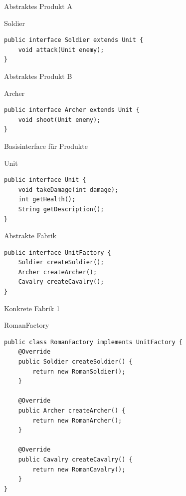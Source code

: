 \begin{frame}[fragile]{Abstraktes Produkt A}
	\begin{exampleblock}{Soldier}
 		\begin{lstlisting}
public interface Soldier extends Unit {
    void attack(Unit enemy);
}
        \end{lstlisting}
 	\end{exampleblock}
\end{frame}

\begin{frame}[fragile]{Abstraktes Produkt B}
	\begin{exampleblock}{Archer}
 		\begin{lstlisting}
public interface Archer extends Unit {
    void shoot(Unit enemy);
}
        \end{lstlisting}
 	\end{exampleblock}
\end{frame}

\begin{frame}[fragile]{Basisinterface für Produkte}
	\begin{exampleblock}{Unit}
 		\begin{lstlisting}
public interface Unit {
    void takeDamage(int damage);
    int getHealth();
    String getDescription();
}
        \end{lstlisting}
 	\end{exampleblock}
\end{frame}

\begin{frame}[fragile]{Abstrakte Fabrik}
	\begin{exampleblock}{}
 		\begin{lstlisting}
public interface UnitFactory {
    Soldier createSoldier();
    Archer createArcher();
    Cavalry createCavalry();
}
        \end{lstlisting}
 	\end{exampleblock}
\end{frame}

\begin{frame}[fragile]{Konkrete Fabrik 1}
	\begin{exampleblock}{RomanFactory}
 		\begin{lstlisting}
public class RomanFactory implements UnitFactory {
    @Override
    public Soldier createSoldier() {
        return new RomanSoldier();
    }

    @Override
    public Archer createArcher() {
        return new RomanArcher();
    }

    @Override
    public Cavalry createCavalry() {
        return new RomanCavalry();
    }
}
        \end{lstlisting}
 	\end{exampleblock}
\end{frame}

